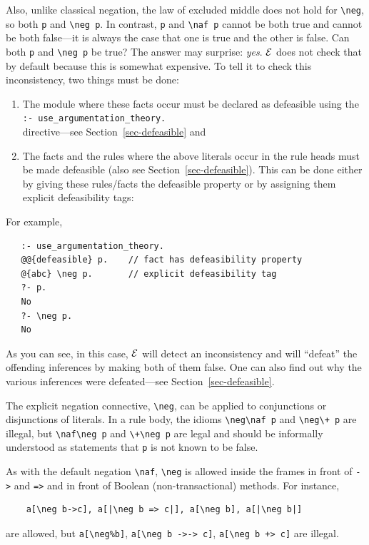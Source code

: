 \documentclass[11pt]{article}
\newcommand{\ERGO}{\mbox{\ensuremath{\cal{E}}\smaller{{\sc{RGO}}}}\xspace}
\newcommand{\FLSYSTEM}{\ERGO}
\newcommand{\bs}{\textbackslash}
\newcommand{\PLGNAF}{\mbox{\texttt{\bs}+}\xspace}
\newcommand{\RULELOGNAF}{{\texttt{{\bs}naf}}\xspace}
\newcommand{\RULELOGNEG}{{\texttt{{\bs}neg}}\xspace}
\begin{document}
Also, unlike classical negation, the law of excluded middle does not hold
for {\tt \RULELOGNEG}, so both \texttt{p} and \texttt{\RULELOGNEG p}.  In
contrast, \texttt{p} and \texttt{\RULELOGNAF p} cannot be both true and
cannot be both false---it is always the case that one is true and the other
is false. Can both \texttt{p} and \texttt{\RULELOGNEG p} be true?   
The answer may surprise: \emph{yes}. \FLSYSTEM does not check that by
default because this is somewhat expensive.
To tell it to check this inconsistency, two things must be done:
\begin{enumerate}
\item  The module where these facts occur must be declared as defeasible
  using the\\
  \texttt{:- use\_argumentation\_theory.}\\
  directive---see
  Section~\ref{sec-defeasible} and
\item The facts and the rules where the above literals occur in the rule
  heads must be made
  defeasible (also see Section~\ref{sec-defeasible}).
  This can be done either by giving these rules/facts the defeasible
  property or by assigning them explicit defeasibility tags:
\end{enumerate}
For example,
\begin{verbatim}
   :- use_argumentation_theory.
   @@{defeasible} p.    // fact has defeasibility property
   @{abc} \neg p.       // explicit defeasibility tag
   ?- p.
   No
   ?- \neg p.
   No
\end{verbatim}
As you can see, in this case, \FLSYSTEM will detect an inconsistency and
will ``defeat'' the offending inferences by making both of them false. One can also find
out why the various inferences were defeated---see
Section~\ref{sec-defeasible}.

The explicit negation connective, {\tt \RULELOGNEG}, can be applied to
conjunctions or disjunctions of literals.
In a rule body, the idioms {\tt \RULELOGNEG \RULELOGNAF p} and {\tt \RULELOGNEG \PLGNAF p} are
illegal, but {\tt \RULELOGNAF \RULELOGNEG p} and {\tt \PLGNAF \RULELOGNEG p} are legal and should be
informally understood as statements that {\tt p} is not known to be false. 

As with the default negation \RULELOGNAF, {\tt \RULELOGNEG} is allowed inside the
frames 
in front of {\tt ->} and {\tt =>} and in front of
Boolean (non-transactional) methods. For instance,
\begin{verbatim}
    a[\neg b->c], a[|\neg b => c|], a[\neg b], a[|\neg b|]
\end{verbatim}
are allowed, but {\tt a[\RULELOGNEG \%b]}, {\tt a[\RULELOGNEG b ->-> c]}, {\tt a[\RULELOGNEG b
  +> c]} are illegal.  
\end{document}
